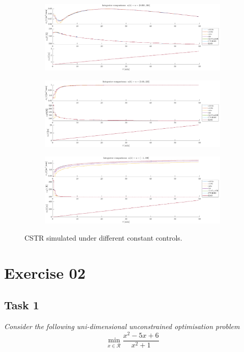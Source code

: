 \documentclass[letterpaper,12pt]{article}
\begin{document}
\begin{figure}[!htbp]
\begin{subfigure}{\textwidth}
	\centering
	\includegraphics[width=1\textwidth]{img/1-1.png}
	\caption{}
\end{subfigure}
\begin{subfigure}{\textwidth}
	\centering
	\includegraphics[width=1\textwidth]{img/1-2.png}
	\caption{}
\end{subfigure}
\begin{subfigure}{\textwidth}
	\centering
	\includegraphics[width=1\textwidth]{img/1-3.png}
	\caption{}
\end{subfigure}
	\caption{CSTR simulated under different constant controls.}
	\label{img:1-1}
\end{figure}

\section*{Exercise 02}
\subsection*{Task 1}
\textit{Consider the following uni-dimensional unconstrained optimisation problem}
\begin{equation}
	\min_{x\in\mathcal{R}} \frac{x^2 - 5x + 6}{x^2 + 1}
\end{equation}
\end{document}
